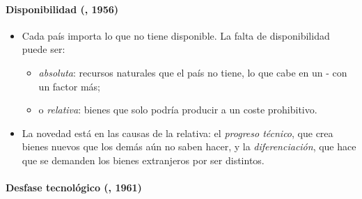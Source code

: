 \documentclass[11pt]{article}
\begin{document}
\paragraph{Disponibilidad (, 1956)}

\begin{itemize}
\item Cada país importa lo que no tiene disponible\nocite{Kravis1956Availability}. La falta de disponibilidad puede ser:
  \begin{itemize}
  \item \emph{absoluta}: recursos naturales que el país no tiene, lo que cabe en un - con un factor más;
  \item o \emph{relativa}: bienes que solo podría producir a un coste prohibitivo.
  \end{itemize}
\item La novedad está en las causas de la relativa: el \emph{progreso técnico}, que crea bienes nuevos que los demás aún no saben hacer, y la \emph{diferenciación}, que hace que se demanden los bienes extranjeros por ser distintos.
\end{itemize}

\paragraph{Desfase tecnológico (, 1961)}
\end{document}

